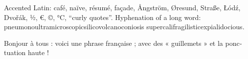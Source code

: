\documentclass{article}
\begin{document}
Accented Latin: café, naïve, résumé, façade, Ångström, Øresund, Straße, Łódź, Dvořák, ½, €, ©, °C, “curly quotes”.
Hyphenation of a long word: pneumonoultramicroscopicsilicovolcanoconiosis supercalifragilisticexpialidocious.
\begin{otherlanguage}{french}
Bonjour à tous : voici une phrase française ; avec des « guillemets » et la ponctuation haute !
\end{otherlanguage}
\end{document}
